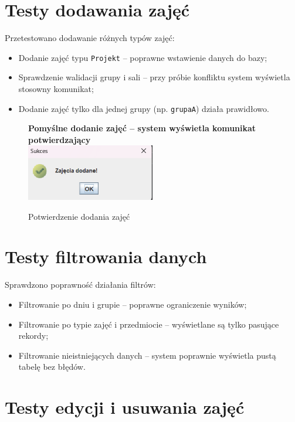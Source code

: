 \section{Testy dodawania zajęć}

Przetestowano dodawanie różnych typów zajęć:

\begin{itemize}
    \item Dodanie zajęć typu \texttt{Projekt} – poprawne wstawienie danych do bazy;
    \item Sprawdzenie walidacji grupy i sali – przy próbie konfliktu system wyświetla stosowny komunikat;
    \item Dodanie zajęć tylko dla jednej grupy (np. \texttt{grupaA}) działa prawidłowo.
\end{itemize}

\begin{figure}[H]
\centering
\textbf{Pomyślne dodanie zajęć – system wyświetla komunikat potwierdzający}\\[0.5em]
\includegraphics[width=0.5\textwidth]{figures/approve/add_zajecia_succesfull.png}
\caption{Potwierdzenie dodania zajęć}
\label{fig:added-success}
\end{figure}

\clearpage
\section{Testy filtrowania danych}

Sprawdzono poprawność działania filtrów:

\begin{itemize}
    \item Filtrowanie po dniu i grupie – poprawne ograniczenie wyników;
    \item Filtrowanie po typie zajęć i przedmiocie – wyświetlane są tylko pasujące rekordy;
    \item Filtrowanie nieistniejących danych – system poprawnie wyświetla pustą tabelę bez błędów.
\end{itemize}

\section{Testy edycji i usuwania zajęć}

